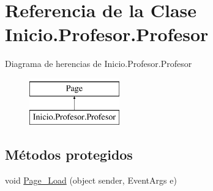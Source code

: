 \hypertarget{classInicio_1_1Profesor_1_1Profesor}{}\section{Referencia de la Clase Inicio.\+Profesor.\+Profesor}
\label{classInicio_1_1Profesor_1_1Profesor}
Diagrama de herencias de Inicio.\+Profesor.\+Profesor\begin{figure}[H]
\begin{center}
\leavevmode
\includegraphics[height=2.000000cm]{classInicio_1_1Profesor_1_1Profesor}
\end{center}
\end{figure}
\subsection*{Métodos protegidos}
\begin{DoxyCompactItemize}
\item 
void \mbox{\hyperlink{classInicio_1_1Profesor_1_1Profesor_a2534a4b35b0889254168e0922046017f}{Page\+\_\+\+Load}} (object sender, Event\+Args e)
\end{DoxyCompactItemize}
